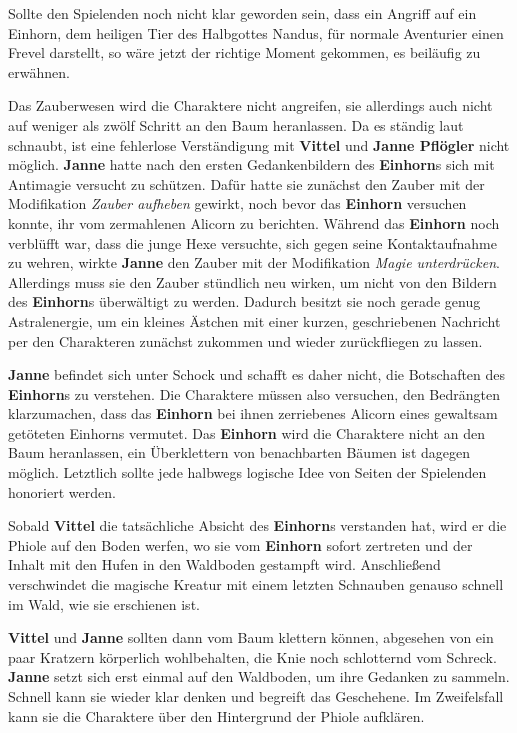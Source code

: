 Sollte den Spielenden noch nicht klar geworden sein, dass ein Angriff auf ein Einhorn, dem heiligen Tier des Halbgottes Nandus, für normale Aventurier einen Frevel darstellt, so wäre jetzt der richtige Moment gekommen, es beiläufig zu erwähnen.


Das Zauberwesen wird die Charaktere nicht angreifen, sie allerdings auch nicht auf weniger als zwölf Schritt an den Baum heranlassen.
Da es ständig laut schnaubt, ist eine fehlerlose Verständigung mit \textbf{Vittel} und \textbf{Janne Pflögler} nicht möglich.
\textbf{Janne} hatte nach den ersten Gedankenbildern des \textbf{Einhorn}s sich mit Antimagie versucht zu schützen.
Dafür hatte sie zunächst den Zauber  mit der Modifikation \textit{Zauber aufheben} gewirkt, noch bevor das \textbf{Einhorn} versuchen konnte, ihr vom zermahlenen Alicorn zu berichten.
Während das \textbf{Einhorn} noch verblüfft war, dass die junge Hexe versuchte, sich gegen seine Kontaktaufnahme zu wehren, wirkte \textbf{Janne} den Zauber  mit der Modifikation \textit{Magie unterdrücken}.
Allerdings muss sie den Zauber stündlich neu wirken, um nicht von den Bildern des \textbf{Einhorn}s überwältigt zu werden.
Dadurch besitzt sie noch gerade genug Astralenergie, um ein kleines Ästchen mit einer kurzen, geschriebenen Nachricht per  den Charakteren zunächst zukommen und wieder zurückfliegen zu lassen. 


\textbf{Janne} befindet sich unter Schock und schafft es daher nicht, die Botschaften des \textbf{Einhorn}s zu verstehen.
Die Charaktere müssen also versuchen, den Bedrängten klarzumachen, dass das \textbf{Einhorn} bei ihnen zerriebenes Alicorn eines gewaltsam getöteten Einhorns vermutet.
Das \textbf{Einhorn} wird die Charaktere nicht an den Baum heranlassen, ein Überklettern von benachbarten Bäumen ist dagegen möglich.
Letztlich sollte jede halbwegs logische Idee von Seiten der Spielenden honoriert werden.


Sobald \textbf{Vittel} die tatsächliche Absicht des \textbf{Einhorn}s verstanden hat, wird er die Phiole auf den Boden werfen, wo sie vom \textbf{Einhorn} sofort zertreten und der Inhalt mit den Hufen in den Waldboden gestampft wird.
Anschließend verschwindet die magische Kreatur mit einem letzten Schnauben genauso schnell im Wald, wie sie erschienen ist.


\textbf{Vittel} und \textbf{Janne} sollten dann vom Baum klettern können, abgesehen von ein paar Kratzern körperlich wohlbehalten, die Knie noch schlotternd vom Schreck.
\textbf{Janne} setzt sich erst einmal auf den Waldboden, um ihre Gedanken zu sammeln. Schnell kann sie wieder klar denken und begreift das Geschehene. Im Zweifelsfall kann sie die Charaktere über den Hintergrund der Phiole aufklären.

